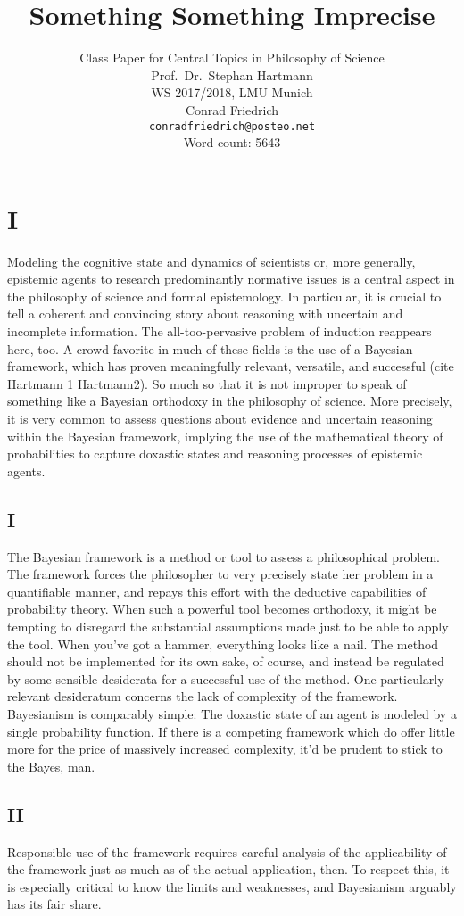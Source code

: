 \documentclass[11pt, a4paper]{scrartcl}
\title{\osfamily{}Something Something Imprecise}
\author{Class Paper for Central Topics in Philosophy of Science \\ Prof.\ Dr.\ Stephan Hartmann \\ WS 2017/2018, LMU Munich \\ Conrad Friedrich \\ \texttt{conradfriedrich@posteo.net} \\ Word count: 5643}
\begin{document}
\maketitle
\thispagestyle{empty}
\newpage
\section{I}
Modeling the cognitive state and dynamics of scientists or, more generally, epistemic agents to research predominantly normative issues is a central aspect in the philosophy of science and formal epistemology. In particular, it is crucial to tell a coherent and convincing story about reasoning with uncertain and incomplete information. The all-too-pervasive problem of induction reappears here, too. A crowd favorite in much of these fields is the use of a Bayesian framework, which has proven meaningfully relevant, versatile, and successful (cite Hartmann 1 Hartmann2). So much so that it is not improper to speak of something like a Bayesian orthodoxy in the philosophy of science. More precisely, it is very common to assess questions about evidence and uncertain reasoning within the Bayesian framework, implying the use of the mathematical theory of probabilities to capture doxastic states and reasoning processes of epistemic agents.

\subsection{I}
The Bayesian framework is a method or tool to assess a philosophical problem. The framework forces the philosopher to very precisely state her problem in a quantifiable manner, and repays this effort with the deductive capabilities of probability theory. When such a powerful tool becomes orthodoxy, it might be tempting to disregard the substantial assumptions made just to be able to apply the tool. When you've got a hammer, everything looks like a nail. The method should not be implemented for its own sake, of course, and instead be regulated by some sensible desiderata for a successful use of the method. One particularly relevant desideratum concerns the lack of complexity of the framework. Bayesianism is comparably simple: The doxastic state of an agent is modeled by a single probability function. If there is a competing framework which do offer little more for the price of massively increased complexity, it'd be prudent to stick to the Bayes, man. 

\subsection{II}
Responsible use of the framework requires careful analysis of the applicability of the framework just as much as of the actual application, then. To respect this, it is especially critical to know the limits and weaknesses, and Bayesianism arguably has its fair share.  
\end{document}
